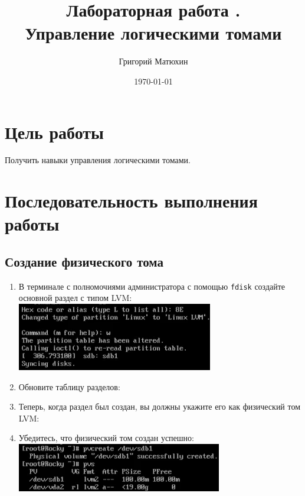 \documentclass[12pt]{article}
\author{Григорий Матюхин}
\date{\today}
\title{Лабораторная работа \textnumero15.\\Управление логическими томами}
\begin{document}
\maketitle
\newpage
\tableofcontents
\newpage
\section{Цель работы}
Получить навыки управления логическими томами.

\section{Последовательность выполнения работы}
\subsection{Создание физического тома}
\begin{enumerate}
	\item В терминале с полномочиями администратора с помощью \texttt{fdisk} создайте основной раздел с типом LVM:
	      \\\includegraphics{4.png}
	\item Обновите таблицу разделов:
	\item Теперь, когда раздел был создан, вы должны укажите его как физический том LVM:
	\item Убедитесь, что физический том создан успешно:
	      \\\includegraphics{5.png}
\end{enumerate}
\end{document}
